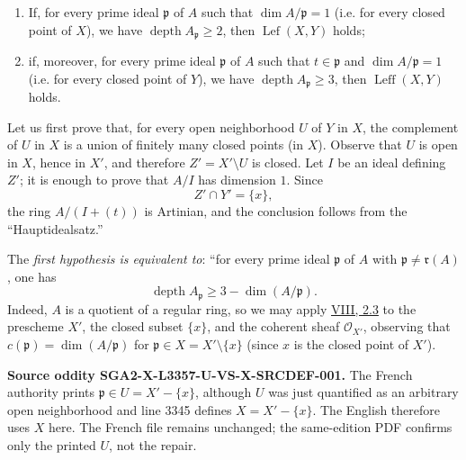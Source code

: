 \documentclass[11pt,a4paper,oneside]{book}
\providecommand{\depthop}{\operatorname{depth}}
\providecommand{\Lefc}{\operatorname{Lef}}
\providecommand{\Leffc}{\operatorname{Leff}}
\theoremstyle{plain}
\theoremstyle{definition}
\theoremstyle{remark}
\begin{document}
\begin{enumerate}[label=(\roman*),leftmargin=2.5em]
\item If, for every prime ideal $\mathfrak p$ of $A$ such that
$\dim A/\mathfrak p=1$ (i.e. for every closed point of $X$), we have
$\depthop A_{\mathfrak p}\geq 2$, then $\Lefc(X,Y)$ holds;

\item if, moreover, for every prime ideal $\mathfrak p$ of $A$ such that
$t\in\mathfrak p$ and $\dim A/\mathfrak p=1$ (i.e. for every closed point
of $Y$), we have $\depthop A_{\mathfrak p}\geq 3$, then $\Leffc(X,Y)$
holds.
\end{enumerate}

Let us first prove that, for every open neighborhood $U$ of $Y$ in $X$, the
complement of $U$ in $X$ is a union of finitely many closed points (in $X$).
Observe that $U$ is open in $X$, hence in $X'$, and therefore
$Z'=X'\setminus U$ is closed. Let $I$ be an ideal defining $Z'$; it is
enough to prove that $A/I$ has dimension $1$. Since
\[
  Z'\cap Y'=\{x\},
\]
the ring $A/(I+(t))$ is Artinian, and the conclusion follows from the
``Hauptidealsatz.''

The \emph{first hypothesis is equivalent to}: ``for every prime ideal
$\mathfrak p$ of $A$ with $\mathfrak p\ne\mathfrak r(A)$, one has
\[
  \operatorname{depth} A_{\mathfrak p}
  \geq 3-\dim(A/\mathfrak p).
\]
Indeed, $A$ is a quotient of a regular ring, so we may apply \hyperref[VIII.2.3]{VIII, 2.3} to
the prescheme $X'$, the closed subset $\{x\}$, and the coherent sheaf
$\mathcal O_{X'}$, observing that
$c(\mathfrak p)=\dim(A/\mathfrak p)$ for
$\mathfrak p\in X=X'\setminus\{x\}$ (since $x$ is the closed point of
$X'$).

\medskip
\noindent\colorbox{noteblue}{\parbox{0.95\linewidth}{\footnotesize
\textbf{Source oddity SGA2-X-L3357-U-VS-X-SRCDEF-001.}
The French authority prints $\mathfrak p\in U=X'-\{x\}$, although $U$ was
just quantified as an arbitrary open neighborhood and line 3345 defines
$X=X'-\{x\}$. The English therefore uses $X$ here. The French file remains
unchanged; the same-edition PDF confirms only the printed $U$, not the
repair.}}
\end{document}
